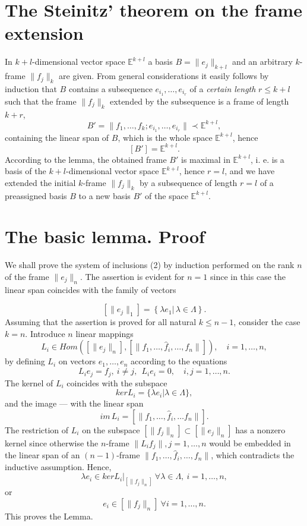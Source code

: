 \documentclass[]{amsart}
\begin{document}
\section{The Steinitz' theorem on the frame extension} 
 In $k+l$-dimensio\-nal vector space $\mathbb E^{k+l}$ a basis $B=\|e_j\|_{k+l}$ and an arbitrary $k$-frame $\|f_j\|_k$ are given. From general considerations it easily follows by induction that $B$ contains a subsequence $e_{i_1},\ldots,e_{i_r}$ of a \emph{certain length} $r\le k+l$ such that the frame   $\|f_j\|_k$ extended by the subsequence is a frame of length $k+r$,
\[
B'=\|f_1,\ldots,f_k;e_{i_1},\ldots,e_{i_r}\|\prec\mathbb E^{k+l},
\]
containing the linear span  of $B$, which is the whole space $\mathbb E^{k+l}$,  hence
\[
[B']=\mathbb E^{k+l}.
\]
According to the lemma, the obtained frame $B'$ is maximal in $\mathbb E^{k+l}$, i. e. is a basis of the $k+l$-dimensional vector space $\mathbb E^{k+l}$, hence $r=l$, and we have extended the initial $k$-frame $\|f_j\|_k$ by a subsequence of length $r=l$ of a preassigned basis $B$ to a new basis $B'$   of the space $\mathbb E^{k+l}$.









\section{The basic lemma. Proof} 

We shall prove the system of inclusions (2) by induction performed on the rank $n$ of the frame $\|e_j\|_n$. The assertion is evident for $n=1$ since 
{in this case}
the linear span  
coincides with the family of vectors



\[
[\|e_j\|_1]=\left\{\lambda e_1|\, \lambda\in\Lambda\right\}.
\]
Assuming that the assertion is proved for all natural $k\le n-1$, consider the case $k=n$. Introduce $n$ linear mappings
\[
L_i\in Hom\left([\|e_j\|_n], [\|f_1,\ldots,\hat f_i,\ldots,f_n\|]\right),\quad i=1,\ldots,n,
\]
by defining $L_i$ on vectors $e_1,\ldots,e_n$ according to the equations
\[
L_ie_j=f_j,\ i\neq j,\ \ L_ie_i=0,\quad i,j=1,\ldots,n.
\]
The kernel of $L_i$ coincides with the subspace
\[
ker L_i=\{\lambda e_i\bigr|\lambda\in\Lambda\},
\]
and the image  ---  with the linear span
\[
 im\,L_i=[\|f_1,\ldots,\hat f_i,\ldots f_n\|].
\]
The restriction of $L_i$ on the subspace $[\|f_j\|_n]\subset [\|e_j\|_n]$ has a nonzero kernel since otherwise the $n$-frame $\|L_if_j\|, j=1,\ldots,n$ would be embedded in the linear span of an $(n-1)$-frame $\|f_1,\ldots,\hat f_i,\ldots,f_n\|$, which contradicts the inductive assumption. Hence,
\[
\lambda e_i\in ker L_i\Bigr|_{[\|f_j\|_n]} \  \forall\lambda\in\Lambda,\ i=1,\ldots,n,
\]
or
\[
e_i\in[\|f_j\|_n]\ \forall i=1,\ldots,n.
\]
This proves the Lemma.
\end{document}
